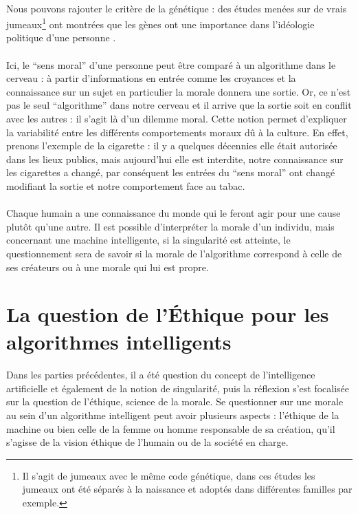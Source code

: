 \documentclass[10pt, french, a4paper]{report}
\begin{document}
\paragraph{}
Nous pouvons rajouter le critère de la génétique : des études menées sur de vrais jumeaux\footnote{Il s'agit de jumeaux avec le même code génétique, dans ces études les jumeaux ont été séparés à la naissance et adoptés dans différentes familles par exemple.} ont montrées que les gènes ont une importance dans l'idéologie politique d'une personne \citep{bouchard_genetic_2003}.

\paragraph{}
Ici, le ``sens moral'' d'une personne peut être comparé à un algorithme dans le cerveau : à partir d'informations en entrée comme les croyances et la connaissance sur un sujet en particulier la morale donnera une sortie. Or, ce n'est pas le seul ``algorithme'' dans notre cerveau et il arrive que la sortie soit en conflit avec les autres : il s'agit là d'un dilemme moral. Cette notion permet d'expliquer la variabilité entre les différents comportements moraux dû à la culture. En effet, prenons l'exemple de la cigarette : il y a quelques décennies elle était autorisée dans les lieux publics, mais aujourd’hui elle est interdite, notre connaissance sur les cigarettes a changé, par conséquent les entrées du ``sens moral'' ont changé modifiant la sortie et notre comportement face au tabac.

\paragraph{}
Chaque humain a une connaissance du monde qui le feront agir pour une cause plutôt qu’une autre. Il est possible d’interpréter la morale d'un individu, mais concernant une machine intelligente, si la singularité est atteinte, le questionnement sera de savoir si la morale de l'algorithme correspond à celle de ses créateurs ou à une morale qui lui est propre.


\section{La question de l'\uppercase{é}thique pour les algorithmes intelligents}
\label{sec:ia_ethique}

\paragraph{}
Dans les parties précédentes, il a été question du concept de l’intelligence artificielle et également de la notion de singularité, puis la réflexion s’est focalisée sur la question de l’éthique, science de la morale. Se questionner sur une morale au sein d’un algorithme intelligent peut avoir plusieurs aspects : l’éthique de la machine ou bien celle de la femme ou homme responsable de sa création, qu’il s’agisse de la vision éthique de l’humain ou de la société en charge.
\end{document}
